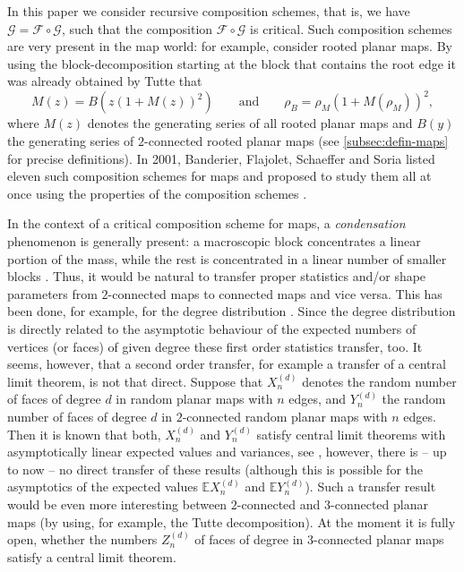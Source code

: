 \documentclass[a4paper,UKenglish,cleveref, autoref, thm-restate]{lipics-v2021}
\renewcommand{\(}{\left(}
\renewcommand{\)}{\right)}
\begin{document}
In this paper we consider recursive composition schemes, that is, we have
$\mathcal{G} = \mathcal{F} \circ \mathcal{G}$, such that 
the composition $\mathcal{F} \circ \mathcal{G}$ is critical.
Such composition schemes are very present in the map world: for example, consider
rooted planar maps. By using the block-decomposition starting at the block that contains the root edge it was already obtained by Tutte \cite{tutte_1963} that
\[M(z) = B\(z\(1+M(z)\)^2\)\qquad\text{and}\qquad \rho_B = \rho_M \(1+M(\rho_M)\)^2,\]
where $M(z)$ denotes the generating series of all rooted planar maps and $B(y)$ the generating series of $2$-connected rooted planar maps (see \cref{subsec:defin-maps} for precise definitions).
In 2001, Banderier, Flajolet, Schaeffer and Soria listed eleven such composition schemes for maps and proposed to study them all at once using the properties of the composition schemes \cite{airy}.

In the context of a critical composition scheme for maps, a \emph{condensation} phenomenon is generally present: a macroscopic block concentrates a linear portion of the mass, while the rest is concentrated in a linear number of smaller blocks \cite{airy}.
Thus, it would be natural to transfer proper statistics and/or shape parameters
from $2$-connected maps to connected maps and vice versa. This has been done, for example, for the degree distribution \cite{zbMATH06297799}. Since the degree distribution is directly related to the asymptotic behaviour of the expected numbers of vertices (or faces) of given degree
these first order statistics transfer, too. It seems, however, that a second order 
transfer, for example a transfer of a central limit theorem, is not that direct.
Suppose that $X_n^{(d)}$ denotes the random number of faces of degree $d$ in 
random planar maps with $n$ edges, and $Y_n^{(d)}$ the random number of faces of degree $d$ in $2$-connected random planar maps with $n$ edges. Then it is known that
both, $X_n^{(d)}$ and $Y_n^{(d)}$ satisfy central limit theorems with asymptotically 
linear expected values and variances, see \cite{DP13}, however, there is -- up to now -- no
direct transfer of these results (although this is possible for the 
asymptotics of the expected values $\mathbb{E} X_n^{(d)}$ and $\mathbb{E} Y_n^{(d)}$).
Such a transfer result would be even more interesting between $2$-connected and
$3$-connected planar maps (by using, for example, the Tutte decomposition). 
At the moment it is fully open, whether the numbers $Z_n^{(d)}$ of faces 
of degree in $3$-connected planar maps satisfy a central limit theorem. 
\end{document}
